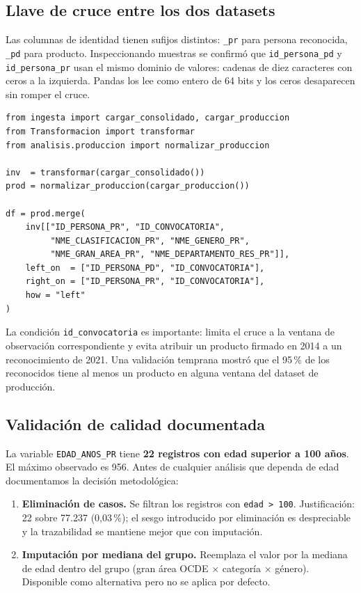 \documentclass[11pt,a4paper,oneside]{article}
\begin{document}
\subsection{Llave de cruce entre los dos datasets}\label{ssec:llave}

Las columnas de identidad tienen sufijos distintos: \texttt{\_pr} para persona reconocida, \texttt{\_pd} para producto. Inspeccionando muestras se confirmó que \texttt{id\_persona\_pd} y \texttt{id\_persona\_pr} usan el mismo dominio de valores: cadenas de diez caracteres con ceros a la izquierda. Pandas los lee como entero de 64 bits y los ceros desaparecen sin romper el cruce.

\begin{lstlisting}[caption={Cruce validado entre las dos fuentes.}]
from ingesta import cargar_consolidado, cargar_produccion
from Transformacion import transformar
from analisis.produccion import normalizar_produccion

inv  = transformar(cargar_consolidado())
prod = normalizar_produccion(cargar_produccion())

df = prod.merge(
    inv[["ID_PERSONA_PR", "ID_CONVOCATORIA",
         "NME_CLASIFICACION_PR", "NME_GENERO_PR",
         "NME_GRAN_AREA_PR", "NME_DEPARTAMENTO_RES_PR"]],
    left_on  = ["ID_PERSONA_PD", "ID_CONVOCATORIA"],
    right_on = ["ID_PERSONA_PR", "ID_CONVOCATORIA"],
    how = "left"
)
\end{lstlisting}

\noindent La condición \texttt{id\_convocatoria} es importante: limita el cruce a la ventana de observación correspondiente y evita atribuir un producto firmado en 2014 a un reconocimiento de 2021. Una validación temprana mostró que el 95\,\% de los reconocidos tiene al menos un producto en alguna ventana del dataset de producción.

\subsection{Validación de calidad documentada}\label{ssec:val-calidad}

La variable \texttt{EDAD\_ANOS\_PR} tiene \textbf{22 registros con edad superior a 100 años}. El máximo observado es 956. Antes de cualquier análisis que dependa de edad documentamos la decisión metodológica:

\begin{enumerate}[label=(\alph*),leftmargin=*]
\item \textbf{Eliminación de casos.} Se filtran los registros con \texttt{edad > 100}. Justificación: 22 sobre 77.237 (0,03\,\%); el sesgo introducido por eliminación es despreciable y la trazabilidad se mantiene mejor que con imputación.
\item \textbf{Imputación por mediana del grupo.} Reemplaza el valor por la mediana de edad dentro del grupo (gran área OCDE × categoría × género). Disponible como alternativa pero no se aplica por defecto.
\end{enumerate}
\end{document}
